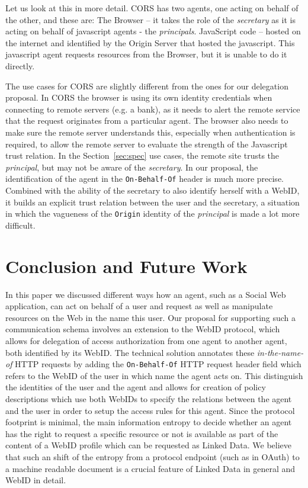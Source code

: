 \documentclass[a4paper]{llncs}
\begin{document}
Let us look at this in more detail.
CORS has two agents, one acting on behalf of the other, and these are: 
The Browser -- it takes the role of the \textit{secretary} as it is acting on behalf of javascript agents - the \textit{principals}.
JavaScript code -- hosted on the internet and identified by the Origin Server that hosted the javascript.
This javascript agent requests resources from the Browser, but it is unable to do it directly.

The use cases for CORS are slightly different from the ones for our delegation proposal. 
In CORS the browser is using its own identity credentials when connecting to remote servers (e.g. a bank), as it needs to alert the remote service that the request originates from a particular agent.
The browser also needs to make sure the remote server understands this, especially when authentication is required, to allow the remote server to evaluate the strength of the Javascript trust relation.
In the Section~\ref{sec:spec} use cases, the remote site trusts the \textit{principal}, but may not be aware of the \textit{secretary}.
In our proposal, the identification of the agent in the \lstinline|On-Behalf-Of| header is much more precise.
Combined with the ability of the secretary to also identify herself with a WebID, it builds an explicit trust relation between the user and the secretary, a situation in which the vagueness of the \lstinline|Origin| identity of the \textit{principal} is made a lot more difficult. 

\section{Conclusion and Future Work}\label{sec:conclusion}

In this paper we discussed different ways how an agent, such as a Social Web application, can act on behalf of a user and request as well as manipulate resources on the Web in the name this user.
Our proposal for supporting such a communication schema involves an extension to the WebID protocol, which allows for delegation of access authorization from one agent to another agent, both identified by its WebID.
The technical solution annotates these \textit{in-the-name-of} HTTP requests by adding the \lstinline|On-Behalf-Of| HTTP request header field which refers to the WebID of the user in which name the agent acts on.
This distinguish the identities of the user and the agent and allows for creation of policy descriptions which use both WebIDs to specify the relations between the agent and the user in order to setup the access rules for this agent.
Since the protocol footprint is minimal, the main information entropy to decide whether an agent has the right to request a specific resource or not is available as part of the content of a WebID profile which can be requested as Linked Data.
We believe that such an shift of the entropy from a protocol endpoint (such as in OAuth) to a machine readable document is a crucial feature of Linked Data in general and WebID in detail.
\end{document}
